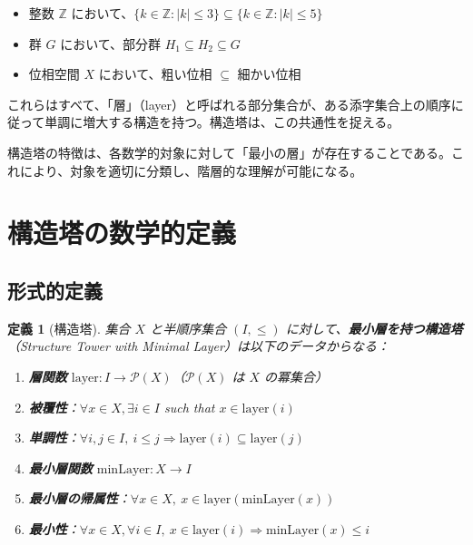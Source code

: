 \documentclass[a4paper,11pt]{ltjsarticle}
\newtheorem{definition}[theorem]{定義}
\begin{document}
\begin{itemize}
\item 整数 $\mathbb{Z}$ において、$\{k \in \mathbb{Z} : |k| \leq 3\} \subseteq \{k \in \mathbb{Z} : |k| \leq 5\}$
\item 群 $G$ において、部分群 $H_1 \subseteq H_2 \subseteq G$
\item 位相空間 $X$ において、粗い位相 $\subseteq$ 細かい位相
\end{itemize}

これらはすべて、「層」（layer）と呼ばれる部分集合が、ある添字集合上の順序に従って単調に増大する構造を持つ。構造塔は、この共通性を捉える。

\begin{remarkbox}
構造塔の特徴は、各数学的対象に対して「最小の層」が存在することである。これにより、対象を適切に分類し、階層的な理解が可能になる。
\end{remarkbox}

\newpage

\section{構造塔の数学的定義}

\subsection{形式的定義}

\begin{definition}[構造塔]
集合 $X$ と半順序集合 $(I, \leq)$ に対して、\textbf{最小層を持つ構造塔}（Structure Tower with Minimal Layer）は以下のデータからなる：

\begin{enumerate}
\item \textbf{層関数} $\text{layer} : I \to \mathcal{P}(X)$（$\mathcal{P}(X)$ は $X$ の冪集合）
\item \textbf{被覆性}：$\forall x \in X, \exists i \in I$ such that $x \in \text{layer}(i)$
\item \textbf{単調性}：$\forall i, j \in I, \ i \leq j \Rightarrow \text{layer}(i) \subseteq \text{layer}(j)$
\item \textbf{最小層関数} $\text{minLayer} : X \to I$
\item \textbf{最小層の帰属性}：$\forall x \in X, \ x \in \text{layer}(\text{minLayer}(x))$
\item \textbf{最小性}：$\forall x \in X, \forall i \in I, \ x \in \text{layer}(i) \Rightarrow \text{minLayer}(x) \leq i$
\end{enumerate}
\end{definition}
\end{document}
